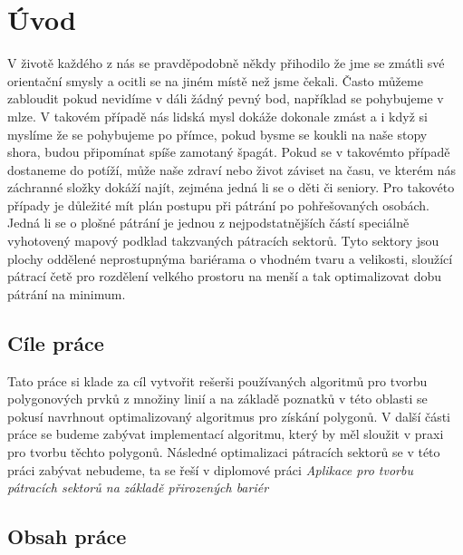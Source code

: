 \chapter{Úvod}
	V životě každého z nás se pravděpodobně někdy přihodilo že jme se zmátli své orientační smysly a ocitli se na jiném místě než jsme čekali. Často můžeme zabloudit pokud nevidíme v dáli žádný pevný bod, například se pohybujeme v mlze. V takovém případě nás lidská mysl dokáže dokonale zmást a i když si myslíme že se pohybujeme po přímce, pokud bysme se koukli na naše stopy shora, budou připomínat spíše zamotaný špagát. Pokud se v takovémto případě dostaneme do potíží, může naše zdraví nebo život záviset na času, ve kterém nás záchranné složky dokáží najít, zejména jedná li se o děti či seniory.
	Pro takovéto případy je důležité mít plán postupu při pátrání po pohřešovaných osobách. Jedná li se o plošné pátrání je jednou z nejpodstatnějších částí speciálně vyhotovený mapový podklad takzvaných pátracích sektorů. Tyto sektory jsou plochy oddělené neprostupnýma bariérama o vhodném tvaru a velikosti, sloužící pátrací četě pro rozdělení velkého prostoru na menší a tak optimalizovat dobu pátrání na minimum.
		
\section{Cíle práce}
	Tato práce si klade za cíl vytvořit rešerši používaných algoritmů pro tvorbu polygonových prvků z množiny linií a na základě poznatků v této oblasti se pokusí navrhnout optimalizovaný algoritmus pro získání polygonů. V další části práce se budeme zabývat implementací algoritmu, který by měl sloužit v praxi pro tvorbu těchto polygonů. Následné optimalizaci pátracích sektorů se v této práci zabývat nebudeme, ta se řeší v diplomové práci \textit{Aplikace pro tvorbu pátracích sektorů na základě přirozených bariér} \cite{sladkova2019aplikace}
	
\section{Obsah práce}

